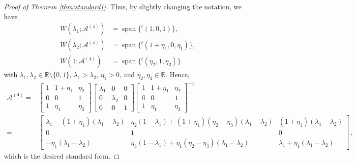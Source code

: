 \documentclass[11pt,a4paper,twosides]{amsart}
\theoremstyle{plain}
\theoremstyle{remark}
\numberwithin{equation}{section}
\newcommand{\R}{\mathbb{R}}
\DeclareMathOperator{\Span}{span}
\theoremstyle{definition}
\newcommand{\1}{{\bf 1}_{\{|x| < |t|\}}}
\begin{document}
\begin{proof}[Proof of Theorem \ref{thm:standard1}]
Thus, by slightly changing the notation,
we have
\begin{align*}
	W(\lambda_1;\mathscr{A}^{(4)}) 
	&= \Span \{{}^t\!(1,0,1) \}, \\
	W(\lambda_2;\mathscr{A}^{(4)}) 
	&= \Span \{{}^t\!(1+\eta_1,0,\eta_1) \}, \\
	W(1;\mathscr{A}^{(4)}) 
	&= \Span \{{}^t\!(\eta_2,1,\eta_3) \}
\end{align*}
with $\lambda_1,\lambda_2 \in \R\setminus\{0,1\}
$, $\lambda_1>\lambda_2$,
$\eta_1>0$, and $\eta_2,\eta_3\in \R$.
Hence,
\begin{align*}
	\mathscr{A}^{(4)}
	={}& \begin{bmatrix}
	1 & 1+\eta_1 & \eta_2 \\
	0 & 0& 1\\
	1 & \eta_1& \eta_3
	\end{bmatrix}
	\begin{bmatrix}
	\lambda_1 & 0 & 0 \\
	0 & \lambda_2 & 0\\
	0 & 0 & 1
	\end{bmatrix}
	\begin{bmatrix}
	1 & 1+\eta_1 & \eta_2 \\
	0 & 0& 1\\
	1 & \eta_1& \eta_3
	\end{bmatrix}^{-1} \\
	={}& \begin{bmatrix}
	\lambda_1 - (1+\eta_1)(\lambda_1-\lambda_2) & 
	\eta_2(1-\lambda_1) +(1+\eta_1)(\eta_2-\eta_3)(\lambda_1-\lambda_2) 
	& (1+\eta_1)(\lambda_1-\lambda_2) \\
	0 & 1& 0\\
	-\eta_1(\lambda_1-\lambda_2) & \eta_3(1- \lambda_1) +\eta_1(\eta_2-\eta_3)(\lambda_1-\lambda_2)& \lambda_1 +\eta_1(\lambda_ 1- \lambda_2)
	\end{bmatrix},
\end{align*}
which is the desired standard form.


\end{proof}
\end{document}
